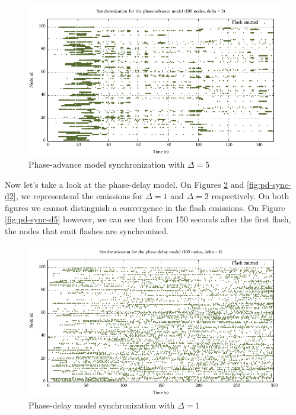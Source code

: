 \documentclass[a4paper, 11pt]{article}
\theoremstyle{plain}
\theoremstyle{definition}
\begin{document}
      \begin{figure}[h]
       \centering
       \includegraphics[width=\textwidth]{../Plots/Firefly-pa-100nodes-5-3.pdf}
       \caption{Phase-advance model synchronization with $\Delta = 5$}
       \label{fig:pa-sync-d5}
     \end{figure}


     Now let's take a look at the phase-delay model. On Figures \ref{fig:pd-sync-d1} and \ref{fig:pd-sync-d2},
     we representend the emissions for $\Delta = 1$ and $\Delta = 2$ respectively. On both figures we cannot
     distinguish a convergence in the flash emissions. On Figure \ref{fig:pd-sync-d5} however, we can see that
     from 150 seconds after the first flash, the nodes that emit flashes are synchronized. 

     \begin{figure}[h]
       \centering
       \includegraphics[width=\textwidth]{../Plots/Firefly-pd-100nodes-1-6.pdf}
       \caption{Phase-delay model synchronization with $\Delta = 1$}
       \label{fig:pd-sync-d1}
     \end{figure}
\end{document}
